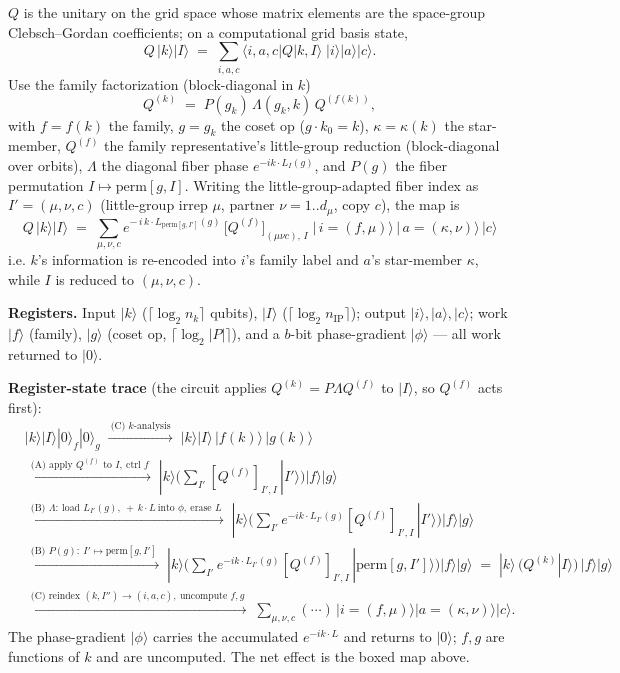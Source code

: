\documentclass[11pt]{article}
\begin{document}
$Q$ is the unitary on the grid space whose matrix elements are the space-group Clebsch--Gordan
coefficients; on a computational grid basis state,
\[
   Q\,|k\rangle|I\rangle \;=\; \sum_{i,a,c}\langle i,a,c|Q|k,I\rangle\;|i\rangle|a\rangle|c\rangle .
\]
Use the family factorization (block-diagonal in $k$)
\[
   Q^{(k)} \;=\; P(g_k)\,\Lambda(g_k,k)\,Q^{(f(k))},
\]
with $f=f(k)$ the family, $g=g_k$ the coset op ($g\!\cdot\!k_0=k$), $\kappa=\kappa(k)$ the star-member,
$Q^{(f)}$ the family representative's little-group reduction (block-diagonal over orbits), $\Lambda$ the
diagonal fiber phase $e^{-ik\cdot L_I(g)}$, and $P(g)$ the fiber permutation $I\mapsto\mathrm{perm}[g,I]$.
Writing the little-group-adapted fiber index as $I'=(\mu,\nu,c)$ (little-group irrep $\mu$, partner
$\nu=1..d_\mu$, copy $c$), the map is
\[
   \boxed{\,Q\,|k\rangle|I\rangle \;=\;
   \sum_{\mu,\nu,c} e^{-\,i\,k\cdot L_{\mathrm{perm}[g,I']}(g)}\,
   \big[Q^{(f)}\big]_{(\mu\nu c),\,I}\;
   \big|\,i=(f,\mu)\big\rangle\,\big|\,a=(\kappa,\nu)\big\rangle\,|c\rangle\,}
\]
i.e. $k$'s information is re-encoded into $i$'s family label and $a$'s star-member $\kappa$, while $I$
is reduced to $(\mu,\nu,c)$.

\textbf{Registers.} Input $|k\rangle$ ($\lceil\log_2 n_k\rceil$ qubits), $|I\rangle$
($\lceil\log_2 n_{\mathrm{IP}}\rceil$); output $|i\rangle,|a\rangle,|c\rangle$; work $|f\rangle$
(family), $|g\rangle$ (coset op, $\lceil\log_2|P|\rceil$), and a $b$-bit phase-gradient $|\phi\rangle$ ---
all work returned to $|0\rangle$.

\textbf{Register-state trace} (the circuit applies $Q^{(k)}=P\Lambda Q^{(f)}$ to $|I\rangle$, so
$Q^{(f)}$ acts first):
\begin{align*}
 &|k\rangle|I\rangle|0\rangle_f|0\rangle_g \;\xrightarrow{\ \text{(C) }k\text{-analysis}\ }\;
   |k\rangle|I\rangle\,|f(k)\rangle\,|g(k)\rangle \\
 &\xrightarrow{\ \text{(A) apply }Q^{(f)}\text{ to }I,\ \text{ctrl }f\ }\;
   |k\rangle\Big(\textstyle\sum_{I'}[Q^{(f)}]_{I',I}\,|I'\rangle\Big)|f\rangle|g\rangle \\
 &\xrightarrow{\ \text{(B) }\Lambda:\ \text{load }L_{I'}(g),\ +\,k\cdot L\ \text{into }\phi,\ \text{erase }L\ }\;
   |k\rangle\Big(\textstyle\sum_{I'} e^{-ik\cdot L_{I'}(g)}[Q^{(f)}]_{I',I}\,|I'\rangle\Big)|f\rangle|g\rangle \\
 &\xrightarrow{\ \text{(B) }P(g):\ I'\mapsto\mathrm{perm}[g,I']\ }\;
   |k\rangle\Big(\textstyle\sum_{I'} e^{-ik\cdot L_{I'}(g)}[Q^{(f)}]_{I',I}\,|\mathrm{perm}[g,I']\rangle\Big)|f\rangle|g\rangle
   \;=\;|k\rangle\,\big(Q^{(k)}|I\rangle\big)\,|f\rangle|g\rangle \\
 &\xrightarrow{\ \text{(C) reindex }(k,I'')\to(i,a,c),\ \text{uncompute }f,g\ }\;
   \textstyle\sum_{\mu,\nu,c}(\cdots)\,|i=(f,\mu)\rangle|a=(\kappa,\nu)\rangle|c\rangle .
\end{align*}
The phase-gradient $|\phi\rangle$ carries the accumulated $e^{-ik\cdot L}$ and returns to $|0\rangle$;
$f,g$ are functions of $k$ and are uncomputed. The net effect is the boxed map above.
\end{document}
